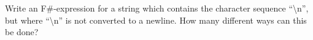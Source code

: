 Write an F\#-expression for a string which contains the character sequence ``\textbackslash n'', but where ``\textbackslash n'' is not converted to a newline. How many different ways can this be done?